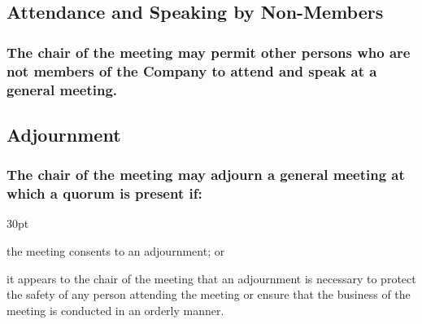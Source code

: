 \documentclass[12pt]{article}
\newcommand*{\fancyref}[1]{\hyperref[{#1}]{\autoref*{#1} (\nameref*{#1})}}
\def\clauseindent{30pt}
\newenvironment{subindentpara}{\raggedright\begin{adjustwidth}{\clauseindent}{}\begin{hanginglist}}{\end{hanginglist}\end{adjustwidth}}
\begin{document}

\subsection{Attendance and Speaking by Non-Members}
\subsubsection[Meeting Chair May Authorise Any Person to Speak at a Meeting]{The chair of the meeting may permit other persons who are not members of the Company to attend and speak at a general meeting.}

\subsection{Adjournment}
\subsubsection[Adjournment of General Meetings with Quorum]{The chair of the meeting may adjourn a general meeting at which a quorum is present if:}
\begin{subindentpara}
    \item the meeting consents to an adjournment; or
    \item it appears to the chair of the meeting that an adjournment is necessary to protect the safety of any person attending the meeting or ensure that the business of the meeting is conducted in an orderly manner.
\end{subindentpara}
\end{document}
